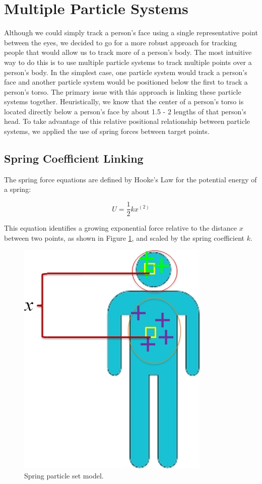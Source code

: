 \documentclass[11pt]{article}
\begin{document}
\section{Multiple Particle Systems}
\label{sec:multparticlesys}

Although we could simply track a person's face using a single representative point between the eyes, we decided to go for a more robust approach for tracking people that would allow us to track more of a person's body. The most intuitive way to do this is to use multiple particle systems to track multiple points over a person's body. In the simplest case, one particle system would track a person's face and another particle system would be positioned below the first to track a person's torso. The primary issue with this approach is linking these particle systems together. Heuristically, we know that the center of a person's torso is located directly below a person's face by about 1.5 - 2 lengths of that person's head. To take advantage of this relative positional relationship between particle systems, we applied the use of spring forces between target points.


\subsection{Spring Coefficient Linking}
The spring force equations are defined by Hooke's Law for the potential energy of a spring:

\begin{equation}
U = \frac{1}{2}kx^(2)
\label{eq:Hooke's Law}
\end{equation}

This equation identifies a growing exponential force relative to the distance $x$ between two points, as shown in Figure \ref{fig:SpringModel}, and scaled by the spring coefficient $k$.  

\begin{figure}[H]
\centering
\includegraphics[scale=0.4]{img/springMan.jpg}
\caption{Spring particle set model.}
\label{fig:SpringModel}
\end{figure}
\end{document}
